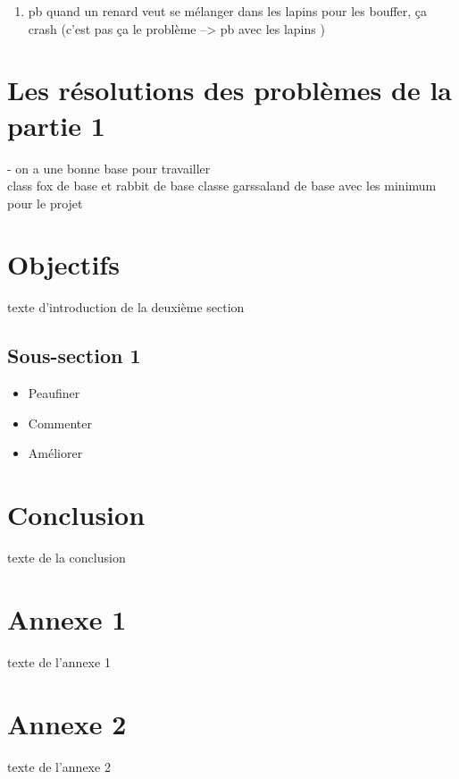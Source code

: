 \documentclass[a4paper]{article}
\begin{document}
{\begin{enumerate}
\item pb quand un renard veut se mélanger dans les lapins pour les bouffer, ça crash (c'est pas ça le problème --> pb avec les lapins )

    \end{enumerate}



\newpage

   \section[Avancés]{Les résolutions des problèmes de la partie 1}
   
- on a une bonne base pour travailler \\ 
class fox de base et rabbit de base 
classe garssaland de base avec les minimum pour le projet 


\newpage

   \section{Objectifs}
      texte d’introduction de la deuxième section
      \subsection{Sous-section 1}

         \begin{itemize}
         	\item Peaufiner
         	\item Commenter
         	\item Améliorer 

         \end{itemize}
         


\newpage
   
   \section*{Conclusion}
      texte de la conclusion 
   
   
\newpage

   \appendix  %
   \section{Annexe 1}
       texte de l’annexe 1 


\newpage
  
   \section{Annexe 2}
      texte de l’annexe 2




}
\end{document}
